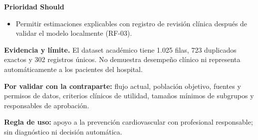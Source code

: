 \documentclass[12pt,a4paper]{article}
\begin{document}
\noindent\textbf{Prioridad Should}\par
\begin{itemize}
  \item Permitir estimaciones explicables con registro de revisión clínica después de validar el modelo localmente (RF-03).
\end{itemize}

\noindent\textbf{Evidencia y límite.} El dataset académico tiene 1.025 filas, 723 duplicados exactos y 302 registros únicos. No demuestra desempeño clínico ni representa automáticamente a los pacientes del hospital.\par

\vspace{0.5em}
\noindent\textbf{Por validar con la contraparte:} flujo actual, población objetivo, fuentes y permisos de datos, criterios clínicos de utilidad, tamaños mínimos de subgrupos y responsables de aprobación.

\vspace{0.5em}
\noindent\textbf{Regla de uso:} apoyo a la prevención cardiovascular con profesional responsable; sin diagnóstico ni decisión automática.
\endgroup
\end{document}
